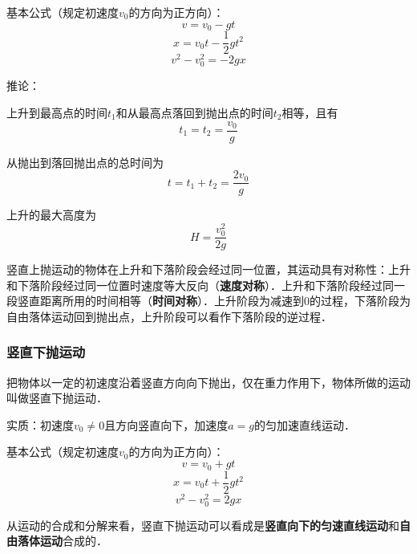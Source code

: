 基本公式（规定初速度$v_0$的方向为正方向）：
\begin{equation}
v=v_0-gt
\end{equation}
\begin{equation}
x=v_0t-\frac12gt^2
\end{equation}
\begin{equation}
v^2-v_0^2=-2gx
\end{equation}

推论：

上升到最高点的时间$t_1$和从最高点落回到抛出点的时间$t_2$相等，且有
\begin{equation}
t_1=t_2=\frac{v_0}{g}
\end{equation}

从抛出到落回抛出点的总时间为
\begin{equation}
t=t_1+t_2=\frac{2v_0}{g}
\end{equation}

上升的最大高度为
\begin{equation}
H=\frac{v_0^2}{2g}
\end{equation}

竖直上抛运动的物体在上升和下落阶段会经过同一位置，其运动具有对称性：上升和下落阶段经过同一位置时速度等大反向（\textbf{速度对称}）．上升和下落阶段经过同一段竖直距离所用的时间相等（\textbf{时间对称}）．上升阶段为减速到0的过程，下落阶段为自由落体运动回到抛出点，上升阶段可以看作下落阶段的逆过程．

\subsubsection{竖直下抛运动}
把物体以一定的初速度沿着竖直方向向下抛出，仅在重力作用下，物体所做的运动叫做竖直下抛运动．

实质：初速度$v_0\neq0$且方向竖直向下，加速度$a=g$的匀加速直线运动．

基本公式（规定初速度$v_0$的方向为正方向）：
\begin{equation}
v=v_0+gt
\end{equation}
\begin{equation}
x=v_0t+\frac12gt^2
\end{equation}
\begin{equation}
v^2-v_0^2=2gx
\end{equation}

从运动的合成和分解来看，竖直下抛运动可以看成是\textbf{竖直向下的匀速直线运动}和\textbf{自由落体运动}合成的．